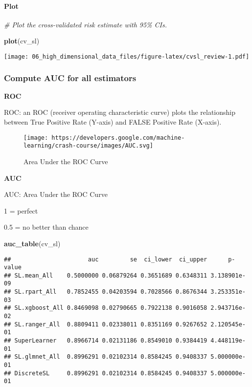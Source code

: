\documentclass[
]{book}
\newenvironment{Shaded}{\begin{snugshade}}{\end{snugshade}}
\newcommand{\CommentTok}[1]{\textcolor[rgb]{0.56,0.35,0.01}{\textit{#1}}}
\newcommand{\KeywordTok}[1]{\textcolor[rgb]{0.13,0.29,0.53}{\textbf{#1}}}
\newcommand{\NormalTok}[1]{#1}
\begin{document}
\hypertarget{plot}{%
\paragraph{Plot}\label{plot}}

\begin{Shaded}
\begin{Highlighting}[]
\CommentTok{\# Plot the cross{-}validated risk estimate with 95\% CIs.}

\KeywordTok{plot}\NormalTok{(cv\_sl)}
\end{Highlighting}
\end{Shaded}

\texttt{[image: 06\_high\_dimensional\_data\_files/figure-latex/cvsl\_review-1.pdf]}

\hypertarget{compute-auc-for-all-estimators}{%
\subsubsection{Compute AUC for all estimators}\label{compute-auc-for-all-estimators}}

\textbf{ROC}

ROC: an ROC (receiver operating characteristic curve) plots the relationship between True Positive Rate (Y-axis) and FALSE Positive Rate (X-axis).

\begin{figure}
\centering
\texttt{[image: https://developers.google.com/machine-learning/crash-course/images/AUC.svg]}
\caption{Area Under the ROC Curve}
\end{figure}

\textbf{AUC}

AUC: Area Under the ROC Curve

1 = perfect

0.5 = no better than chance

\begin{Shaded}
\begin{Highlighting}[]
\KeywordTok{auc\_table}\NormalTok{(cv\_sl)}
\end{Highlighting}
\end{Shaded}

\begin{verbatim}
##                      auc         se  ci_lower  ci_upper      p-value
## SL.mean_All    0.5000000 0.06879264 0.3651689 0.6348311 3.138901e-09
## SL.rpart_All   0.7852455 0.04203594 0.7028566 0.8676344 3.253351e-03
## SL.xgboost_All 0.8469098 0.02790665 0.7922138 0.9016058 2.943716e-02
## SL.ranger_All  0.8809411 0.02338011 0.8351169 0.9267652 2.120545e-01
## SuperLearner   0.8966714 0.02131186 0.8549010 0.9384419 4.448119e-01
## SL.glmnet_All  0.8996291 0.02102314 0.8584245 0.9408337 5.000000e-01
## DiscreteSL     0.8996291 0.02102314 0.8584245 0.9408337 5.000000e-01
\end{verbatim}
\end{document}
